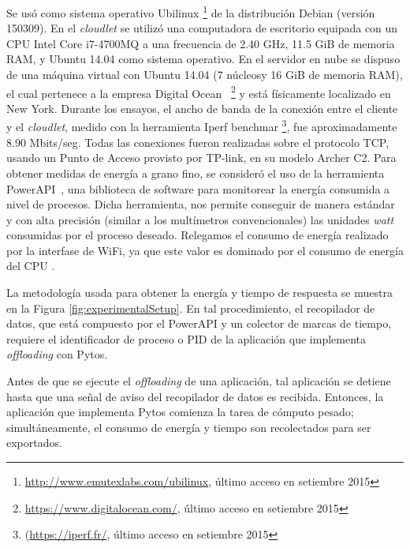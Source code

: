 Se usó como sistema operativo Ubilinux \footnote{\url{http://www.emutexlabs.com/ubilinux}, último acceso en setiembre 2015} 
de la distribución Debian (versión 150309). En el \textit{cloudlet} se utilizó una computadora de escritorio equipada con un CPU Intel Core i7-4700MQ
a una frecuencia de 2.40 GHz, 11.5 GiB de memoria RAM, y Ubuntu 14.04 como sistema operativo. En el servidor en nube se dispuso de una máquina 
virtual con Ubuntu 14.04 (7 núcleosy 16 GiB de memoria RAM), el cual pertenece a la empresa Digital Ocean~
\footnote{\url{https://www.digitalocean.com/}, último acceso en setiembre 2015} y está físicamente localizado en New York. 
Durante los ensayos, el ancho de banda de la conexión entre el cliente y el \textit{cloudlet}, medido con la herramienta Iperf benchmar 
\footnote{(\url{https://iperf.fr/}, último acceso en setiembre 2015}, fue aproximadamente 8.90 Mbits/seg. 
Todas las conexiones fueron realizadas sobre el protocolo TCP, usando un Punto de Acceso provisto por TP-link, en su modelo Archer C2.
Para obtener medidas de energía a grano fino, se consideró el uso de la herramienta PowerAPI~\cite{bourdon2013powerapi}, una biblioteca de 
software para monitorear la energía consumida a nivel de procesos. Dicha herramienta, nos permite conseguir de manera estándar y con alta precisión
(similar a los multímetros convencionales) las unidades \textit{watt} consumidas por el proceso deseado. Relegamos el consumo de energía realizado
por la interfase de WiFi, ya que este valor es dominado por el consumo de energía del CPU \cite{chen2015smartphone}. 

La metodología usada para obtener la energía y tiempo de respuesta se muestra en la Figura \ref{fig:experimentalSetup}. En tal procedimiento, 
el recopilador de datos, que está compuesto por el PowerAPI y un colector de marcas de tiempo, requiere el identificador de proceso o PID de la 
aplicación que implementa \textit{offloading} con Pytos. 

Antes de que se ejecute el \textit{offloading} de una aplicación, tal aplicación se detiene hasta que una señal de aviso del recopilador de datos
es recibida. Entonces, la aplicación que implementa Pytos comienza la tarea de cómputo pesado; simultáneamente, el consumo de energía y tiempo son 
recolectados para ser exportados. 

